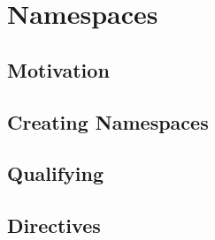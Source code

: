 \chapter{Namespaces}\label{ch:Namespace}

\section{Motivation}\label{sec:namespace-motivation}

\section{Creating Namespaces}\label{sec:namespace-creating}

\section{Qualifying}\label{sec:namespace-qualify}

\section{ Directives}\label{sec:namespace-using}


